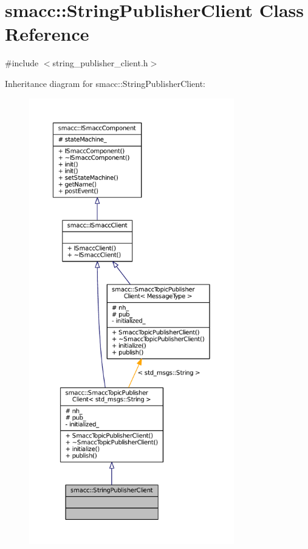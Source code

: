\hypertarget{classsmacc_1_1StringPublisherClient}{}\section{smacc\+:\+:String\+Publisher\+Client Class Reference}
\label{classsmacc_1_1StringPublisherClient}


{\ttfamily \#include $<$string\+\_\+publisher\+\_\+client.\+h$>$}



Inheritance diagram for smacc\+:\+:String\+Publisher\+Client\+:
\nopagebreak
\begin{figure}[H]
\begin{center}
\leavevmode
\includegraphics[height=550pt]{classsmacc_1_1StringPublisherClient__inherit__graph}
\end{center}
\end{figure}


